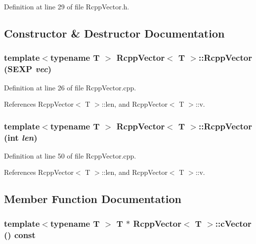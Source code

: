 Definition at line 29 of file RcppVector.h.

\subsection{Constructor \& Destructor Documentation}
\hypertarget{classRcppVector_a0925b350f636a546e58ad0329786500a}{
\subsubsection[{RcppVector}]{\setlength{\rightskip}{0pt plus 5cm}template$<$typename T $>$ {\bf RcppVector}$<$ T $>$::{\bf RcppVector} (SEXP {\em vec})}}
\label{classRcppVector_a0925b350f636a546e58ad0329786500a}


Definition at line 26 of file RcppVector.cpp.

References RcppVector$<$ T $>$::len, and RcppVector$<$ T $>$::v.\hypertarget{classRcppVector_aeb7797ca2b2ac2d03fee0a543993f17b}{
\subsubsection[{RcppVector}]{\setlength{\rightskip}{0pt plus 5cm}template$<$typename T $>$ {\bf RcppVector}$<$ T $>$::{\bf RcppVector} (int {\em len})}}
\label{classRcppVector_aeb7797ca2b2ac2d03fee0a543993f17b}


Definition at line 50 of file RcppVector.cpp.

References RcppVector$<$ T $>$::len, and RcppVector$<$ T $>$::v.

\subsection{Member Function Documentation}
\hypertarget{classRcppVector_a5cf66a342593e509bb4a545305a1327e}{
\subsubsection[{cVector}]{\setlength{\rightskip}{0pt plus 5cm}template$<$typename T $>$ T $\ast$ {\bf RcppVector}$<$ T $>$::cVector () const}}
\label{classRcppVector_a5cf66a342593e509bb4a545305a1327e}


